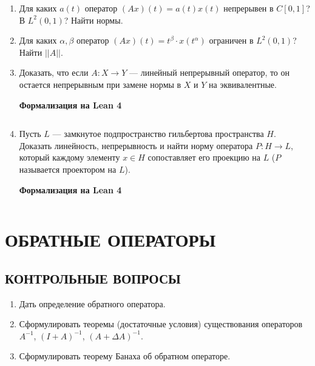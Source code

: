 \documentclass[12pt,a4paper]{article}
\begin{document}
\begin{enumerate}
\item Для каких $a(t)$ оператор $(Ax)(t) = a(t)x(t)$ непрерывен в $C[0,1]$? В $L^{2}(0,1)$? Найти нормы.

\item Для каких $\alpha, \beta$ оператор $(Ax)(t) = t^{\beta} \cdot x(t^{\alpha})$ ограничен в $L^{2}(0,1)$? Найти $||A||$.

\newpage
\item Доказать, что если $A: X \rightarrow Y$ — линейный непрерывный оператор, то он остается непрерывным при замене нормы в $X$ и $Y$ на эквивалентные.


\begin{center}\small\textbf{Формализация на Lean 4}\end{center}
\inputminted{lean}{FunAn/Section14_LinearOperators/Task06.lean}

\newpage
\item Пусть $L$ — замкнутое подпространство гильбертова пространства $H$. Доказать линейность, непрерывность и найти норму оператора $P: H \rightarrow L$, который каждому элементу $x \in H$ сопоставляет его проекцию на $L$ ($P$ называется проектором на $L$).

\begin{center}\small\textbf{Формализация на Lean 4}\end{center}
\inputminted{lean}{FunAn/Section14_LinearOperators/Task07.lean}

\end{enumerate}

\section{ОБРАТНЫЕ ОПЕРАТОРЫ}

\subsection*{КОНТРОЛЬНЫЕ ВОПРОСЫ}
\begin{enumerate}
\item Дать определение обратного оператора.
\item Сформулировать теоремы (достаточные условия) существования операторов $A^{-1}$, $(I+A)^{-1}$, $(A+\Delta A)^{-1}$.
\item Сформулировать теорему Банаха об обратном операторе.
\end{enumerate}
\end{document}
